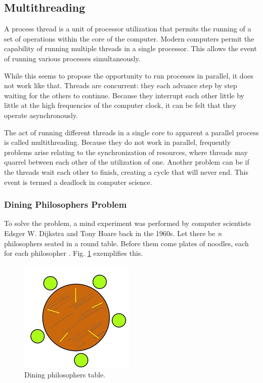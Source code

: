 \documentclass[12pt]{article}
\begin{document}
\subsection{Multithreading}

A process thread is a unit of processor utilization that permits the running of a set of operations within the core of the computer. Modern computers permit the capability of running multiple threads in a single processor. This allows the event of running various processes simultaneously.

While this seems to propose the opportunity to run processes in parallel, it does not work like that. Threads are concurrent: they each advance step by step waiting for the others to continue. Because they interrupt each other little by little at the high frequencies of the computer clock, it can be felt that they operate asynchronously.

The act of running different threads in a single core to apparent a parallel process is called multithreading. Because they do not work in parallel, frequently problems arise relating to the synchronization of resources, where threads may quarrel between each other of the utilization of one. Another problem can be if the threads wait each other to finish, creating a cycle that will never end. This event is termed a deadlock in computer science.

\subsubsection{Dining Philosophers Problem}

To solve the problem, a mind experiment was performed by computer scientists Edsger W. Dijkstra and Tony Hoare back in the 1960s. Let there be \emph{n} philosophers seated in a round table. Before them come plates of noodles, each for each philosopher \cite{osbook}. Fig. \ref{fig:phil} exemplifies this.

\begin{figure}[ht]
\includegraphics{phil}
\centering
\caption{Dining philosophers table.}
\label{fig:phil}
\end{figure}
\end{document}
